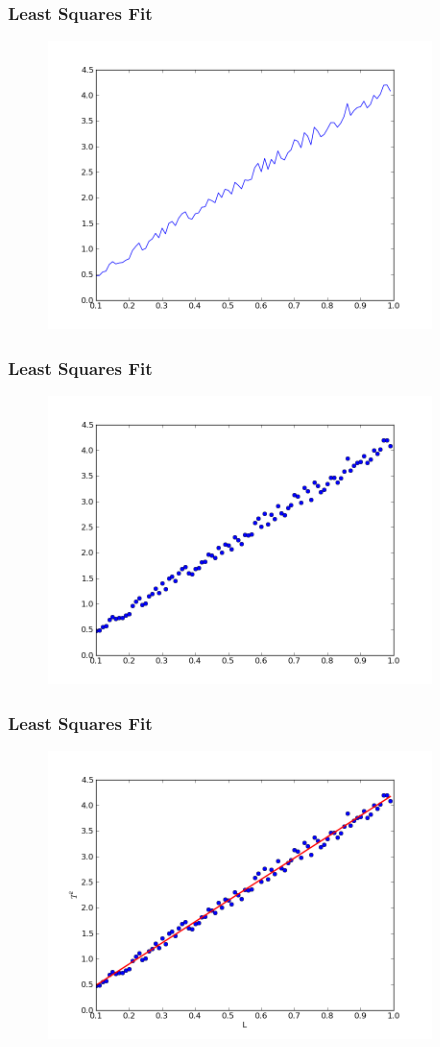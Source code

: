 \documentclass[14pt,compress]{beamer}
\begin{document}
\begin{frame}[fragile]
\frametitle{Least Squares Fit}
\vspace{-0.15in}
\begin{figure}
\includegraphics[width=4in]{data/L-Tsq-Line.png}
\end{figure}
\end{frame}

\begin{frame}[fragile]
\frametitle{Least Squares Fit}
\vspace{-0.15in}
\begin{figure}
\includegraphics[width=4in]{data/L-Tsq-points.png}
\end{figure}
\end{frame}

\begin{frame}[fragile]
\frametitle{Least Squares Fit}
\vspace{-0.15in}
\begin{figure}
\includegraphics[width=4in]{data/least-sq-fit.png}
\end{figure}
\end{frame}
\end{document}
